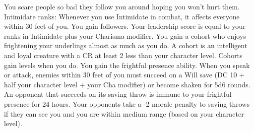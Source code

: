 \skillfeat
{You scare people so bad they follow you around hoping you won't hurt them.}
{Intimidate ranks:}
{Whenever you use Intimidate in combat, it affects everyone within 30 feet of you.}{
You gain followers. Your leadership score is equal to your ranks in Intimidate plus your Charisma modifier.}
{You gain a cohort who enjoys frightening your underlings almost as much as you do. A cohort is an intelligent and loyal creature with a CR at least 2 less than your character level. Cohorts gain levels when you do.}
{You gain the frightful presence ability. When you speak or attack, enemies within 30 feet of you must succeed on a Will save (DC 10 + half your character level + your Cha modifier) or become shaken for 5d6 rounds. An opponent that succeeds on its saving throw is immune to your frightful presence for 24 hours.}
{Your opponents take a -2 morale penalty to saving throws if they can see you and you are within medium range (based on your character level).}